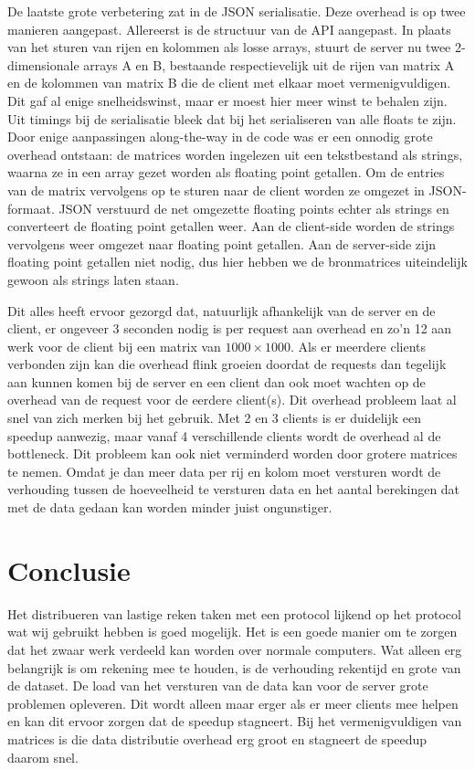 \documentclass[11pt]{article}
\begin{document}
De laatste grote verbetering zat in de JSON serialisatie. Deze overhead is op twee manieren
aangepast. Allereerst is de structuur van de API aangepast. In plaats van het sturen van rijen
en kolommen als losse arrays, stuurt de server nu twee 2-dimensionale arrays A en B,
bestaande respectievelijk uit de rijen van matrix A en de kolommen van matrix B die de client
met elkaar moet vermenigvuldigen. Dit gaf al enige snelheidswinst, maar er moest hier meer winst
te behalen zijn. Uit timings bij de serialisatie bleek dat bij het serialiseren van alle floats
te zijn. Door enige aanpassingen along-the-way in de code was er een onnodig grote overhead
ontstaan: de matrices worden ingelezen uit een tekstbestand als strings, waarna ze in een array
gezet worden als floating point getallen. Om de entries van de matrix vervolgens op te sturen
naar de client worden ze omgezet in JSON-formaat. JSON verstuurd de net omgezette floating points
echter als strings en converteert de floating point getallen weer. Aan de client-side worden de
strings vervolgens weer omgezet naar floating point getallen. Aan de server-side zijn floating
point getallen niet nodig, dus hier hebben we de bronmatrices uiteindelijk gewoon als strings
laten staan.

Dit alles heeft ervoor gezorgd dat, natuurlijk afhankelijk van de server en de
client, er ongeveer 3 seconden nodig is per request aan overhead en zo'n 12 aan
werk voor de client bij een matrix van $1000\times1000$. Als er meerdere clients
verbonden zijn kan die overhead flink groeien doordat de requests dan tegelijk
aan kunnen komen bij de server en een client dan ook moet wachten op de overhead
van de request voor de eerdere client(s). Dit overhead probleem laat al snel van
zich merken bij het gebruik. Met 2 en 3 clients is er duidelijk een speedup
aanwezig, maar vanaf 4 verschillende clients wordt de overhead al de bottleneck.
Dit probleem kan ook niet verminderd worden door grotere matrices te nemen.
Omdat je dan meer data per rij en kolom moet versturen wordt de verhouding
tussen de hoeveelheid te versturen data en het aantal berekingen dat met de data
gedaan kan worden minder juist ongunstiger.


\section{Conclusie}
Het distribueren van lastige reken taken met een protocol lijkend op het protocol
wat wij gebruikt hebben is goed mogelijk. Het is een goede manier om te zorgen
dat het zwaar werk verdeeld kan worden over normale computers. Wat alleen erg
belangrijk is om rekening mee te houden, is de verhouding rekentijd en grote van
de dataset. De load van het versturen van de data kan voor de server grote
problemen opleveren. Dit wordt alleen maar erger als er meer clients mee helpen
en kan dit ervoor zorgen dat de speedup stagneert. Bij het vermenigvuldigen van
matrices is die data distributie overhead erg groot en stagneert de speedup
daarom snel.
\end{document}
